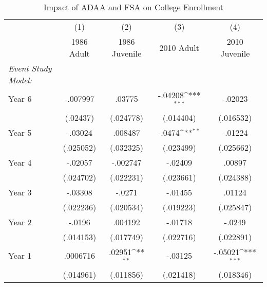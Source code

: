 \begin{table}[htbp]\centering
\def\sym#1{\ifmmode^{#1}\else\(^{#1}\)\fi}
\caption{Impact of ADAA and FSA on College Enrollment}
\begin{tabular}{l*{4}{c}}
\hline\hline
                    &\multicolumn{1}{c}{(1)}&\multicolumn{1}{c}{(2)}&\multicolumn{1}{c}{(3)}&\multicolumn{1}{c}{(4)}\\
                    &\multicolumn{1}{c}{1986 Adult}&\multicolumn{1}{c}{1986 Juvenile}&\multicolumn{1}{c}{2010 Adult}&\multicolumn{1}{c}{2010 Juvenile}\\
\hline
\emph{Event Study Model:}&                     &                     &                     &                     \\
[1em]
Year 6              &    -.007997         &      .03775         &     -.04208\sym{***}&     -.02023         \\
                    &    (.02437)         &   (.024778)         &   (.014404)         &   (.016532)         \\
[1em]
Year 5              &     -.03024         &     .008487         &      -.0474\sym{**} &     -.01224         \\
                    &   (.025052)         &   (.032325)         &   (.023499)         &   (.025662)         \\
[1em]
Year 4              &     -.02057         &    -.002747         &     -.02409         &      .00897         \\
                    &   (.024702)         &   (.022231)         &   (.023661)         &   (.024388)         \\
[1em]
Year 3              &     -.03308         &      -.0271         &     -.01455         &      .01124         \\
                    &   (.022236)         &   (.020534)         &   (.019223)         &   (.025847)         \\
[1em]
Year 2              &      -.0196         &     .004192         &     -.01718         &      -.0249         \\
                    &   (.014153)         &   (.017749)         &   (.022716)         &   (.022891)         \\
[1em]
Year 1              &    .0006716         &      .02951\sym{**} &     -.03125         &     -.05021\sym{***}\\
                    &   (.014961)         &   (.011856)         &   (.021418)         &   (.018346)         \\

\end{tabular}
\end{table}

